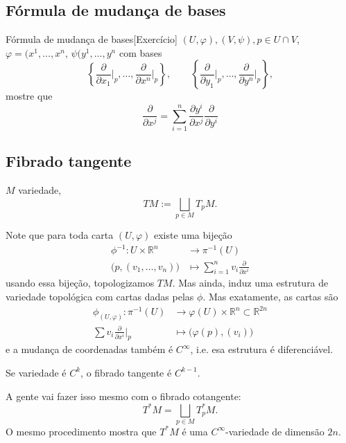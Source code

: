 \subsection{Fórmula de mudança de bases}

\begin{thing6}{Fórmula de mudança de bases}[Exercício]\leavevmode
\((U,\varphi),(V,\psi), p \in U \cap V\), \(\varphi=(x^1,\ldots,x^n\), \(\psi(y^1,\ldots,y^n\) com bases
\[\left\{ \frac{\partial }{\partial x_1}\Big|_{p},\ldots,\frac{\partial }{\partial x^n}\Big|_{p} \right\}, \qquad \left\{ \frac{\partial }{\partial y_1}\Big|_{p},\ldots,\frac{\partial }{\partial y^n}\Big|_{p} \right\},\]
mostre que
\[\frac{\partial }{\partial x^j}=\sum_{i=1}^n \frac{\partial y^i}{\partial x^j}\frac{\partial }{\partial y^i}\]

\end{thing6}

\subsection{Fibrado tangente}
\(M\) variedade,
\[TM:=\bigsqcup_{p \in M}T_pM.\]

Note que para toda carta \((U,\varphi)\) existe uma bijeção
\begin{align*}
	\phi^{-1}:U \times \mathbb{R}^n &\longrightarrow \pi^{-1}(U) \\
	\Big(p,(v_1,\ldots,v_n) \Big) &\longmapsto \sum_{i=1}^n v_i\frac{\partial }{\partial x^i}
\end{align*}
usando essa bijeção, topologizamos \(TM\). Mas ainda, induz uma estrutura de variedade topológica com cartas dadas pelas \(\phi\). Mas exatamente, as cartas são
\begin{align*}
	\phi_{(U,\varphi)}: \pi^{-1}(U) &\longrightarrow \varphi(U)\times\mathbb{R}^n \subset \mathbb{R}^{2n} \\
	\sum v_i \frac{\partial }{\partial x^i}\Big|_{p} &\longmapsto \Big(\varphi(p),(v_i) \Big)
\end{align*}
e a mudança de coordenadas também é \(C^\infty\), i.e. esa estrutura é diferenciável.

\begin{remark}\leavevmode
	Se variedade é \(C^k\), o fibrado tangente é \(C^{k-1}\).
\end{remark}

A gente vai fazer isso mesmo com o fibrado cotangente:
\[T^*  M= \bigsqcup_{p \in M} T^*_pM.\]
O mesmo procedimento mostra que \(T^* M\) é uma \(C^\infty\)-variedade de dimensão \(2n\).

